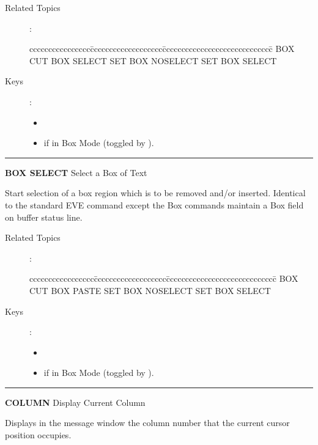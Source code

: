 \begin{description}
\item[Related Topics]:
\begin{tabbing}
cccccccccccccccc\=ccccccccccccccccccc\=ccccccccccccccccccccccccccccc\=\kill
BOX CUT        \> BOX SELECT   \> SET BOX NOSELECT  \>  SET BOX SELECT \\
\end{tabbing}
\item[Keys]:
         \begin{itemize}
         \item \gold\ 
         \item {} if in Box Mode (toggled by  ).
         \end{itemize}
\end{description}

\goodbreak

\rule{\textwidth}{0.3mm}

{\Large {\bf BOX SELECT} \hfill Select a Box of Text}

\medskip
Start selection of a box region which is to be removed and/or inserted.
Identical to the standard EVE command except the Box commands maintain a Box
field on buffer status line.

\begin{description}
\item[Related Topics]:
\begin{tabbing}
ccccccccccccccccc\=ccccccccccccccccccc\=ccccccccccccccccccccccccccccc\=\kill
BOX CUT \>   BOX PASTE  \>   SET BOX NOSELECT  \>   SET BOX SELECT \\
\end{tabbing}
\item[Keys]:
         \begin{itemize}
         \item \gold\ 
         \item {} if in Box Mode (toggled by  ).
         \end{itemize}

\end{description}

\goodbreak

\rule{\textwidth}{0.3mm}

{\Large {\bf COLUMN} \hfill Display Current Column}

\medskip
  Displays in the message window the column number that the current cursor
  position occupies.

